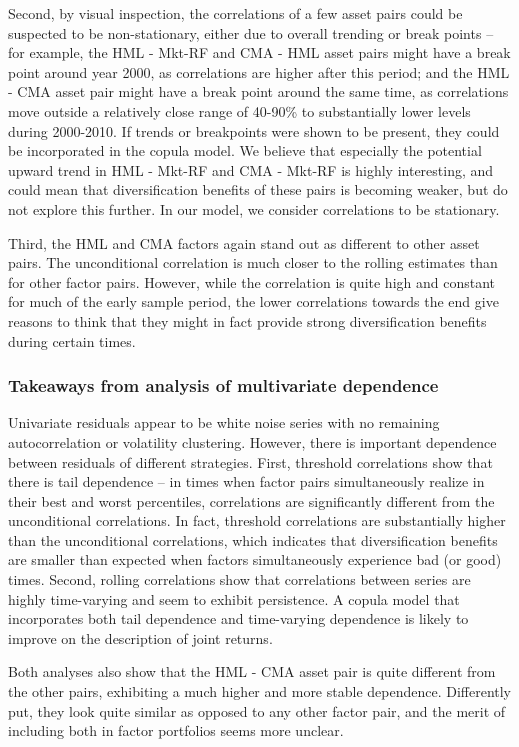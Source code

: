 Second, by visual inspection, the correlations of a few asset pairs could be suspected to be non-stationary, either due to overall trending or break points -- for example, the HML - Mkt-RF and CMA - HML asset pairs might have a break point around year 2000, as correlations are higher after this period; and the HML - CMA asset pair might have a break point around the same time, as correlations move outside a relatively close range of 40-90\% to substantially lower levels during 2000-2010. If trends or breakpoints were shown to be present, they could be incorporated in the copula model. We believe that especially the potential upward trend in HML - Mkt-RF and CMA - Mkt-RF is highly interesting, and could mean that diversification benefits of these pairs is becoming weaker, but do not explore this further. In our model, we consider correlations to be stationary.

Third, the HML and CMA factors again stand out as different to other asset pairs. The unconditional correlation is much closer to the rolling estimates than for other factor pairs. However, while the correlation is quite high and constant for much of the early sample period, the lower correlations towards the end give reasons to think that they might in fact provide strong diversification benefits during certain times.

\subsubsection{Takeaways from analysis of multivariate dependence}
Univariate residuals appear to be white noise series with no remaining autocorrelation or volatility clustering. However, there is important dependence between residuals of different strategies. First, threshold correlations show that there is tail dependence -- in times when factor pairs simultaneously realize in their best and worst percentiles, correlations are significantly different from the unconditional correlations. In fact, threshold correlations are substantially higher than the unconditional correlations, which indicates that diversification benefits are smaller than expected when factors simultaneously experience bad (or good) times. Second, rolling correlations show that correlations between series are highly time-varying and seem to exhibit persistence. A copula model that incorporates both tail dependence and time-varying dependence is likely to improve on the description of joint returns.

Both analyses also show that the HML - CMA asset pair is quite different from the other pairs, exhibiting a much higher and more stable dependence. Differently put, they look quite similar as opposed to any other factor pair, and the merit of including both in factor portfolios seems more unclear.